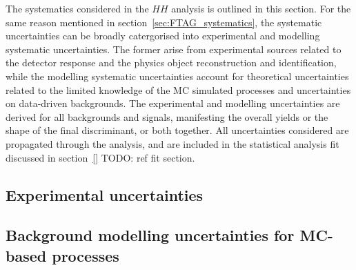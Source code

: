 The systematics considered in the $HH$ analysis
is outlined in this section. For the same reason 
mentioned in section~\ref{sec:FTAG_systematics}, 
the systematic uncertainties can be broadly catergorised
into experimental and modelling systematic uncertainties. 
The former arise from experimental sources related to the detector 
response and the physics object reconstruction and identification,
while the modelling systematic uncertainties account for 
theoretical uncertainties related to the limited 
knowledge of the MC simulated processes 
and uncertainties on data-driven backgrounds. 
The experimental and modelling uncertainties are derived for 
all backgrounds and signals, manifesting the overall yields
or the shape of the final discriminant, or both together.
All uncertainties considered are propagated through the analysis,
and are included in the statistical analysis fit
discussed in section~\ref{} TODO: ref fit section.


\subsection{Experimental uncertainties}
\label{sec:systematics_experimental}





\subsection{Background modelling uncertainties for MC-based processes}
\label{sec:systematics_backgroundmodelling}





% 
